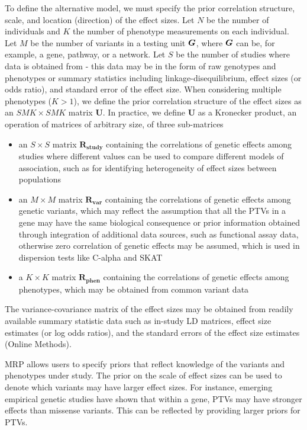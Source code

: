  To define the alternative model, we must specify the prior correlation structure, scale, and location (direction) of the effect sizes. Let $N$ be the number of individuals and $K$ the number of phenotype measurements on each individual. Let $M$ be the number of variants in a testing unit ${\boldsymbol G}$, where ${\boldsymbol G}$ can be, for example, a gene, pathway, or a network. Let $S$ be the number of studies where data is obtained from - this data may be in the form of raw genotypes and phenotypes or summary statistics including linkage-disequilibrium, effect sizes (or odds ratio), and standard error of the effect size. When considering multiple phenotypes ($K > 1$), we define the prior correlation structure of the effect sizes as an $SMK\times SMK$ matrix $\mathbf{U}$. In practice, we define $\mathbf{U}$ as a Kronecker product, an operation of matrices of arbitrary size, of three sub-matrices
\begin{itemize}
\item an $S\times S$ matrix $\mathbf{R_{\textrm{study}}}$ containing the correlations of genetic effects among studies where different values can be used to compare different models of association, such as for identifying heterogeneity of effect sizes between populations~\cite{band2013imputation}
\item an $M\times M$ matrix $\mathbf{R_{\textrm{var}}}$ containing the correlations of genetic effects among genetic variants, which may reflect the assumption that all the PTVs in a gene may have the same biological consequence\cite{macarthur,rivas2013assessing,rivas2015effect} or prior information obtained through integration of additional data sources, such as functional assay data\cite{majithia2014rare,findlay2014saturation}, otherwise zero correlation of genetic effects may be assumed, which is used in dispersion tests like C-alpha\cite{calpha,clarke2013flexible} and SKAT\cite{skat}
\item a $K\times K$ matrix $\mathbf{R_{\textrm{phen}}}$ containing the correlations of genetic effects among phenotypes, which may be obtained from common variant data\cite{cotsapas2011pervasive,solovieff2013pleiotropy,gencorr2015}
\end{itemize}
The variance-covariance matrix of the effect sizes may be obtained from readily available summary statistic data such as in-study LD matrices, effect size estimates (or log odds ratios), and the standard errors of the effect size estimates (Online Methods).

MRP allows users to specify priors that reflect knowledge of the variants and phenotypes under study. The prior on the scale of effect sizes can be used to denote which variants may have larger effect sizes. For instance, emerging empirical genetic studies have shown that within a gene, PTVs may have stronger effects than missense variants\cite{do2015exome}. This can be reflected by providing larger priors for PTVs.

